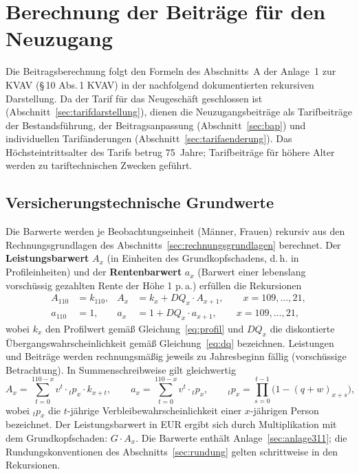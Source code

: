 \section{Berechnung der Beiträge für den Neuzugang}\label{sec:beitraege}

Die Beitragsberechnung folgt den Formeln des Abschnitts~A der Anlage~1
zur KVAV (\S\,10 Abs.\,1 KVAV) in der nachfolgend dokumentierten
rekursiven Darstellung. Da der Tarif für das Neugeschäft geschlossen
ist (Abschnitt~\ref{sec:tarifdarstellung}), dienen die
Neuzugangsbeiträge als Tarifbeiträge der Bestandsführung, der
Beitragsanpassung (Abschnitt~\ref{sec:bap}) und individuellen
Tarifänderungen (Abschnitt~\ref{sec:tarifaenderung}). Das
Höchsteintrittsalter des Tarifs betrug 75~Jahre; Tarifbeiträge für
höhere Alter werden zu tariftechnischen Zwecken geführt.

\subsection{Versicherungstechnische Grundwerte}\label{sec:grundwerte}

Die Barwerte werden je Beobachtungseinheit (Männer, Frauen) rekursiv
aus den Rechnungsgrundlagen des Abschnitts~\ref{sec:rechnungsgrundlagen}
berechnet. Der \textbf{Leistungsbarwert} $A_x$ (in Einheiten des
Grundkopfschadens, d.\,h. in Profileinheiten) und der
\textbf{Rentenbarwert} $a_x$ (Barwert einer lebenslang vorschüssig
gezahlten Rente der Höhe 1 p.\,a.) erfüllen die Rekursionen
\begin{align}
A_{110} &= k_{110}, &
A_x &= k_x + DQ_x\cdot A_{x+1}, \qquad x = 109,\dots,21,
\label{eq:rekA}\\
a_{110} &= 1, &
a_x &= 1 + DQ_x\cdot a_{x+1}, \qquad x = 109,\dots,21,
\label{eq:reka}
\end{align}
wobei $k_x$ den Profilwert gemäß Gleichung~\eqref{eq:profil} und
$DQ_x$ die diskontierte Übergangswahrscheinlichkeit gemäß
Gleichung~\eqref{eq:dq} bezeichnen. Leistungen und Beiträge werden
rechnungsmäßig jeweils zu Jahresbeginn fällig (vorschüssige
Betrachtung). In Summenschreibweise gilt gleichwertig
\begin{equation}
A_x = \sum_{t=0}^{110-x} v^t \cdot {}_{t}p_x \cdot k_{x+t},
\qquad
a_x = \sum_{t=0}^{110-x} v^t \cdot {}_{t}p_x,
\qquad
{}_{t}p_x = \prod_{s=0}^{t-1}\bigl(1-(q+w)_{x+s}\bigr),
\label{eq:barwertsumme}
\end{equation}
wobei ${}_{t}p_x$ die $t$-jährige Verbleibewahrscheinlichkeit einer
$x$-jährigen Person bezeichnet. Der Leistungsbarwert in EUR ergibt sich
durch Multiplikation mit dem Grundkopfschaden: $G\cdot A_x$. Die
Barwerte enthält Anlage~\ref{sec:anlage311}; die
Rundungskonventionen des Abschnitts~\ref{sec:rundung} gelten
schrittweise in den Rekursionen.

